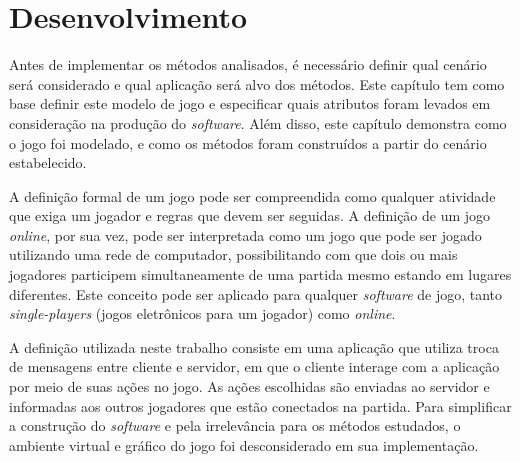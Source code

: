 \chapter{Desenvolvimento}
\label{cap:desenvolvimento}



Antes de implementar os métodos analisados, é necessário definir qual cenário será considerado e qual aplicação será alvo dos métodos. Este capítulo tem como base definir este modelo de jogo e especificar quais atributos foram levados em consideração na produção do \textit{software}. Além disso, este capítulo demonstra como o jogo foi modelado, e como os métodos foram construídos a partir do cenário estabelecido. 

A definição formal de um jogo pode ser compreendida como qualquer atividade que exiga um jogador e regras que devem ser seguidas. A definição de um jogo \textit{online}, por sua vez, pode ser interpretada como um jogo que pode ser jogado utilizando uma rede de computador, possibilitando com que dois ou mais jogadores participem simultaneamente de uma partida mesmo estando em lugares diferentes. Este conceito pode ser aplicado para qualquer \textit{software} de jogo, tanto \textit{single-players} (jogos eletrônicos para um jogador) como \textit{online}.

A definição utilizada neste trabalho consiste em uma aplicação que utiliza troca de mensagens entre cliente e servidor, em que o cliente interage com a aplicação por meio de suas ações no jogo. As ações escolhidas são enviadas ao servidor e informadas aos outros jogadores que estão conectados na partida. Para simplificar a construção do \textit{software} e pela irrelevância para os métodos estudados, o ambiente virtual e gráfico do jogo foi desconsiderado em sua implementação.


